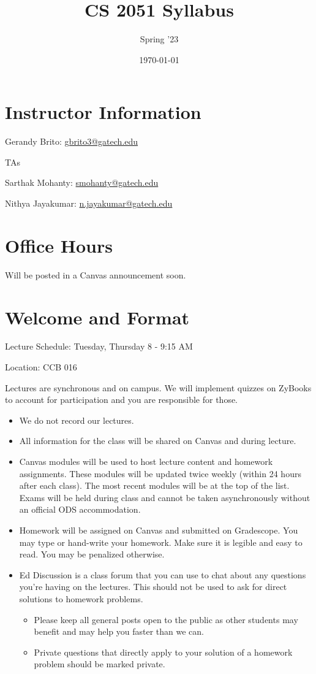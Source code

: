 \documentclass{article}
\title{CS 2051 Syllabus}
\author{Spring '23}
\date{\today}
\begin{document}
\maketitle

\section{Instructor Information}


\noindent Gerandy Brito: \url{gbrito3@gatech.edu}

\noindent TAs

\noindent Sarthak Mohanty: \url{smohanty@gatech.edu}

\noindent Nithya Jayakumar: \url{n.jayakumar@gatech.edu}

\section{Office Hours}
Will be posted in a Canvas announcement soon.


\section{Welcome and Format}

Lecture Schedule: Tuesday, Thursday 8 - 9:15 AM

Location: CCB 016

Lectures are synchronous and on campus. We will implement quizzes on ZyBooks to account for participation and you are responsible for those.
\begin{itemize}
    \item We do not record our lectures.
    \item All information for the class will be shared on Canvas and during lecture. 
    \item Canvas modules will be used to host lecture content and homework assignments. These modules will be updated twice weekly (within 24 hours after each class).  The most recent modules will be at the top of the list.
    Exams will be held during class and cannot be taken asynchronously without an official ODS accommodation.
    \item Homework will be assigned on Canvas and submitted on Gradescope. You may type or hand-write your homework. Make sure it is legible and easy to read. You may be penalized otherwise.
    \item Ed Discussion is a class forum that you can use to chat about any questions you're having on the lectures.  This should not be used to ask for direct solutions to homework problems. 
        \begin{itemize}
        \item Please keep all general posts open to the public as other students may benefit and may help you faster than we can. 
        \item Private questions that directly apply to your solution of a homework problem should be marked private.
        \end{itemize}
\end{itemize}
\end{document}
